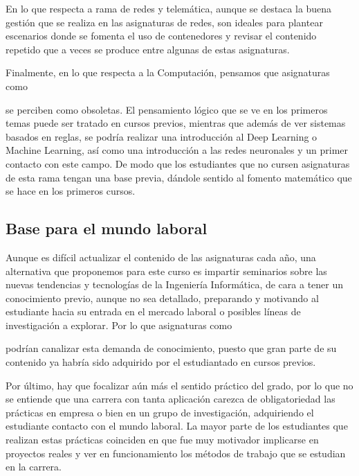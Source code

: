 En lo que respecta a rama de redes y telemática,
aunque se destaca la buena gestión que se realiza en las asignaturas de redes,
son ideales para plantear escenarios donde se fomenta el uso de contenedores y
revisar el contenido repetido que
a veces se produce entre algunas de estas asignaturas.

Finalmente, en lo que respecta a la Computación,
pensamos que asignaturas como \subject{Sistemas inteligentes}
se perciben como obsoletas.
El pensamiento lógico que se ve en los primeros temas
puede ser tratado en cursos previos,
mientras que además de ver sistemas basados en reglas,
se podría realizar una introducción al Deep Learning o Machine Learning,
así como una introducción a las redes neuronales y
un primer contacto con este campo.
De modo que los estudiantes que no cursen asignaturas de esta rama
tengan una base previa,
dándole sentido al fomento matemático que se hace en los primeros cursos.

\subsection{Base para el mundo laboral}

Aunque es difícil actualizar el contenido de las asignaturas cada año,
una alternativa que proponemos para este curso es
impartir seminarios sobre las nuevas tendencias y tecnologías
de la Ingeniería Informática,
de cara a tener un conocimiento previo, aunque no sea detallado,
preparando y motivando al estudiante hacia su entrada en el mercado laboral o
posibles líneas de investigación a explorar.
Por lo que asignaturas como
\subject{Tecnologías Específicas de la Ingeniería Informática (TEII)}
podrían canalizar esta demanda de conocimiento,
puesto que gran parte de su contenido ya habría sido adquirido
por el estudiantado en cursos previos.

Por último, hay que focalizar aún más el sentido práctico del grado,
por lo que no se entiende que una carrera con tanta aplicación
carezca de obligatoriedad las prácticas en empresa
o bien en un grupo de investigación,
adquiriendo el estudiante contacto con el mundo laboral.
La mayor parte de los estudiantes que realizan estas prácticas coinciden en que
fue muy motivador implicarse en proyectos reales y
ver en funcionamiento los métodos de trabajo que se estudian en la carrera.


